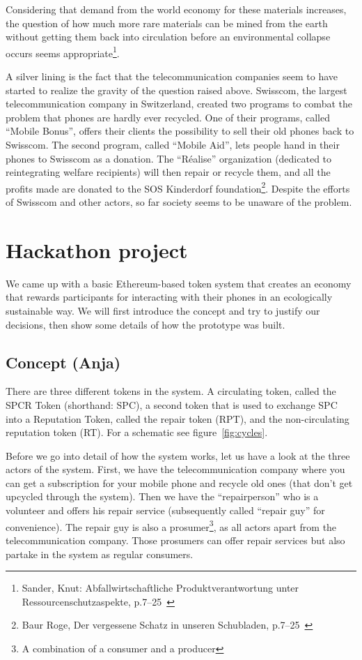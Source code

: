 \documentclass[11pt]{scrartcl}
\begin{document}
Considering that demand from the world economy for these materials increases, the question of how much more rare materials can be mined from the earth without getting them back into circulation before an environmental collapse occurs seems appropriate\footnote{Sander, Knut: Abfallwirtschaftliche Produktverantwortung unter Ressourcenschutzaspekte, p.7--25~\cite{Studie}}.

A silver lining is the fact that the telecommunication companies seem to have started to realize the gravity of the question raised above. Swisscom, the largest telecommunication company in Switzerland, created two programs to combat the problem that phones are hardly ever recycled. One of their programs, called ``Mobile Bonus'', offers their clients the possibility to sell their old phones back to Swisscom. The second program, called ``Mobile Aid'', lets people hand in their phones to Swisscom as a donation. The ``Réalise'' organization (dedicated to reintegrating welfare recipients) will then repair or recycle them, and all the profits made are donated to the SOS Kinderdorf foundation\footnote{Baur Roge, Der vergessene Schatz in unseren Schubladen, p.7--25~\cite{Swisscom}}. Despite the efforts of Swisscom and other actors, so far society seems to be unaware of the problem.

\section{Hackathon project}

We came up with a basic Ethereum-based token system that creates an economy that
rewards participants for interacting with their phones in an ecologically sustainable
way. We will first introduce the concept and try to justify our decisions, then
show some details of how the prototype was built.

\subsection{Concept (Anja)}
There are three different tokens in the system. A circulating token, called the SPCR Token (shorthand: SPC), a  second token that is used to exchange SPC into a Reputation Token, called the repair token (RPT), and the non-circulating reputation token (RT). For a schematic see figure~\ref{fig:cycles}.

Before we go into detail of how the system works, let us have a look at the three actors of the system. First, we have the telecommunication company where you can get a subscription for your mobile phone and recycle old ones (that don't get upcycled through the system). Then we have the ``repairperson'' who is a volunteer and offers his repair service (subsequently called ``repair guy'' for convenience). The repair guy is also a prosumer\footnote{A combination of a consumer and a producer}, as all actors apart from the telecommunication company. Those prosumers can offer repair services but also partake in the system as regular consumers.
\end{document}
